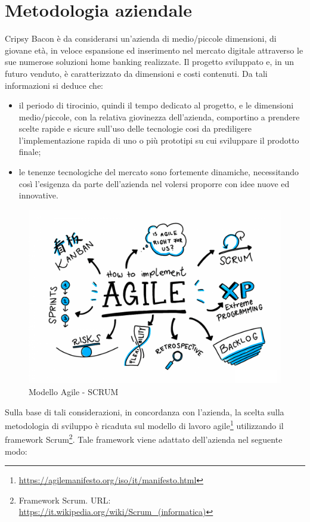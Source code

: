\section{Metodologia aziendale}
Cripsy Bacon è da considerarsi un'azienda di medio/piccole dimensioni, di giovane età, in veloce espansione ed inserimento nel mercato digitale attraverso le sue numerose soluzioni home banking realizzate. Il progetto sviluppato e, in un futuro venduto, è caratterizzato da dimensioni e costi contenuti. Da tali informazioni si deduce che: 
\begin{itemize}
    \item il periodo di tirocinio, quindi il tempo dedicato al progetto, e le dimensioni medio/piccole, con la relativa giovinezza dell'azienda, comportino a prendere scelte rapide e sicure sull'uso delle tecnologie cosi da prediligere l'implementazione rapida di uno o più prototipi su cui sviluppare il prodotto finale;
    \item le tenenze tecnologiche del mercato sono fortemente dinamiche, necessitando così l'esigenza da parte dell'azienda nel volersi proporre con idee nuove ed innovative.
\end{itemize}
\begin{figure}[H] 
    \centering 
    \includegraphics[width=1\columnwidth]{immagini/scrum.png}
    \caption{\label{fig:alexa_aws}Modello Agile - SCRUM}
\end{figure}
Sulla base di tali considerazioni, in concordanza con l'azienda, la scelta sulla metodologia di sviluppo è ricaduta sul modello di lavoro agile\footnote{\href{Modello agile: URL: https://agilemanifesto.org/iso/it/manifesto.html}{https://agilemanifesto.org/iso/it/manifesto.html}} utilizzando il framework Scrum\footnote{Framework Scrum. URL: \href{https://it.wikipedia.org/wiki/Scrum\_(informatica)}{https://it.wikipedia.org/wiki/Scrum\_(informatica)}}. Tale framework viene adattato dell'azienda nel seguente modo:
